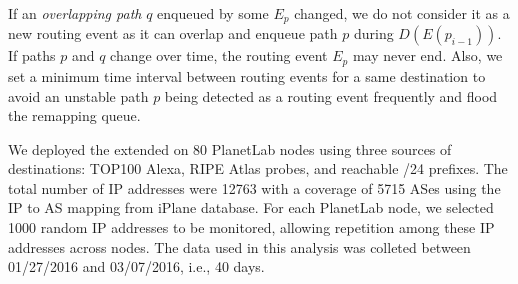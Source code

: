 If an \emph{overlapping path} $q$ enqueued by some $E_p$ changed, we do not consider
it as a new routing event as it can overlap and enqueue path $p$ during
$D(E(p_{i-1}))$. If paths $p$ and $q$ change over time, the routing event $E_p$
may never end. Also, we set a minimum time interval between routing events for a same
destination to avoid an unstable path $p$ being detected as a routing event
frequently and flood the remapping queue.

We deployed the extended \dtrack{} on 80 PlanetLab nodes using three 
sources of destinations: TOP100 Alexa,  RIPE Atlas probes, and reachable
/24 prefixes. The total number of IP addresses were 12763 with a coverage of 5715 ASes 
using the IP to AS mapping from iPlane database. For each PlanetLab node, we
selected 1000 random IP addresses to be monitored, allowing repetition among these IP 
addresses across nodes. The data used in this analysis was colleted between 01/27/2016 
and 03/07/2016, i.e., 40 days.

